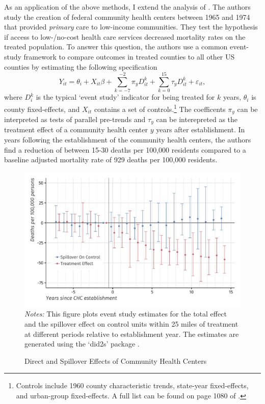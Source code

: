 \documentclass[11pt]{article}
\begin{document}
As an application of the above methods, I extend the analysis of \citet{Bailey_Goodman_Bacon_2015}. The authors study the creation of federal community health centers between 1965 and 1974 that provided \textit{primary} care to low-income communities. They test the hypothesis if access to low-/no-cost health care services decreased mortality rates on the treated population. To answer this question, the authors use a common event-study framework to compare outcomes in treated counties to all other US counties by estimating the following specification 
\begin{equation}\label{eq:chc_es}
    Y_{it} = \theta_i + X_{it} \beta + \sum_{k = -7}^{-2} \pi_y D_{it}^k + \sum_{k = 0}^{15} \tau_{y} D_{it}^k + \varepsilon_{it},
\end{equation}
where $D_i^k$ is the typical `event study' indicator for being treated for $k$ years, $\theta_i$ is county fixed-effects, and $X_{it}$ contains a set of controls.\footnote{Controls include 1960 county characteristic trends, state-year fixed-effects, and urban-group fixed-effects. A full list can be found on page 1080 of \citet{Bailey_Goodman_Bacon_2015}.} The coefficents $\pi_y$ can be interpreted as tests of parallel pre-trends and $\tau_y$ can be interepreted as the treatment effect of a community health center $y$ years after establishment. In years following the establishment of the community health centers, the authors find a reduction of between 15-30 deaths per 100,000 residents compared to a baseline adjusted mortality rate of 929 deaths per 100,000 residents. 

\begin{figure}[tb!]
    \caption{Direct and Spillover Effects of Community Health Centers}
    \label{fig:chc_es_spill}
        
    {\centering
        \includegraphics[width=\textwidth]{../../figures/figure-chc-es_combined.pdf}
    }
    {\footnotesize
        \textit{Notes:} This figure plots event study estimates for the total effect and the spillover effect on control units within 25 miles of treatment at different periods relative to establishment year. The estimates are generated using the `did2s' package \citep{did2s}. 
    }
\end{figure}
\end{document}
